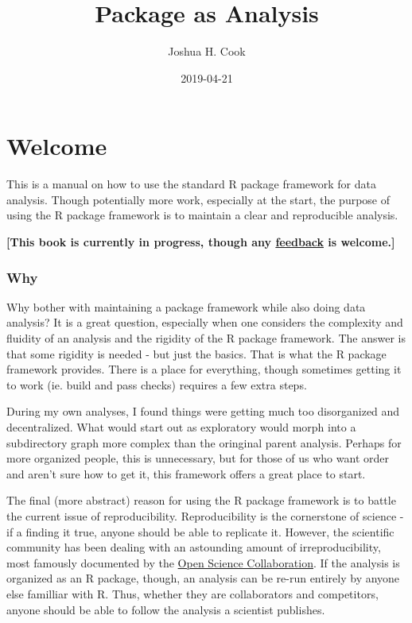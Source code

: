 \documentclass[]{book}
\title{Package as Analysis}
\author{Joshua H. Cook}
\date{2019-04-21}
\begin{document}
\maketitle

{
\setcounter{tocdepth}{1}
\tableofcontents
}
\hypertarget{welcome}{%
\chapter*{Welcome}\label{welcome}}

This is a manual on how to use the standard R package framework for data analysis. Though potentially more work, especially at the start, the purpose of using the R package framework is to maintain a clear and reproducible analysis.

\textbf{{[}This book is currently in progress, though any \href{https://github.com/jhrcook/package-as-analysis/issues}{feedback} is welcome.{]}}

\hypertarget{why}{%
\subsection*{Why}\label{why}}

Why bother with maintaining a package framework while also doing data analysis? It is a great question, especially when one considers the complexity and fluidity of an analysis and the rigidity of the R package framework. The answer is that some rigidity is needed - but just the basics. That is what the R package framework provides. There is a place for everything, though sometimes getting it to work (ie. build and pass checks) requires a few extra steps.

During my own analyses, I found things were getting much too disorganized and decentralized. What would start out as exploratory would morph into a subdirectory graph more complex than the oringinal parent analysis. Perhaps for more organized people, this is unnecessary, but for those of us who want order and aren't sure how to get it, this framework offers a great place to start.

The final (more abstract) reason for using the R package framework is to battle the current issue of reproducibility. Reproducibility is the cornerstone of science - if a finding it true, anyone should be able to replicate it. However, the scientific community has been dealing with an astounding amount of irreproducibility, most famously documented by the \href{http://science.sciencemag.org/content/349/6251/aac4716}{Open Science Collaboration}. If the analysis is organized as an R package, though, an analysis can be re-run entirely by anyone else familliar with R. Thus, whether they are collaborators and competitors, anyone should be able to follow the analysis a scientist publishes.
\end{document}
